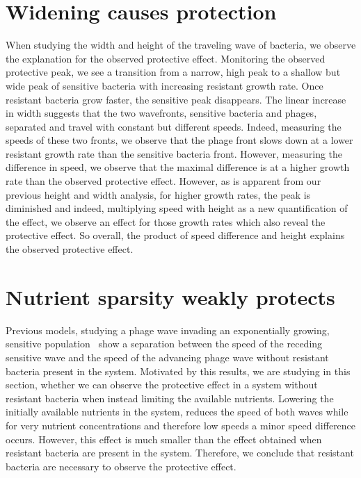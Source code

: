 \section{Widening causes protection}
When studying the width and height of the traveling wave of bacteria, we observe the explanation for the observed protective effect. Monitoring the observed protective peak, we see a transition from a narrow, high peak to a shallow but wide peak of sensitive bacteria with increasing resistant growth rate. Once resistant bacteria grow faster, the sensitive peak disappears. The linear increase in width suggests that the two wavefronts, sensitive bacteria and phages, separated and travel with constant but different speeds. Indeed, measuring the speeds of these two fronts, we observe that the phage front slows down at a lower resistant growth rate than the sensitive bacteria front. However, measuring the difference in speed, we observe that the maximal difference is at a higher growth rate than the observed protective effect. However, as is apparent from our previous height and width analysis, for higher growth rates, the peak is diminished and indeed, multiplying speed with height as a new quantification of the effect, we observe an effect for those growth rates which also reveal the protective effect. So overall, the product of speed difference and height explains the observed protective effect. 
\section{Nutrient sparsity weakly protects}
Previous models, studying a phage wave invading an exponentially growing, sensitive population~\cite{BLA} show a separation between the speed of the receding sensitive wave and the speed of the advancing phage wave without resistant bacteria present in the system. Motivated by this results, we are studying in this section, whether we can observe the protective effect in a system without resistant bacteria when instead limiting the available nutrients. Lowering the initially available nutrients in the system, reduces the speed of both waves while for very nutrient concentrations and therefore low speeds a minor speed difference occurs. However, this effect is much smaller than the effect obtained when resistant bacteria are present in the system. Therefore, we conclude that resistant bacteria are necessary to observe the protective effect.
